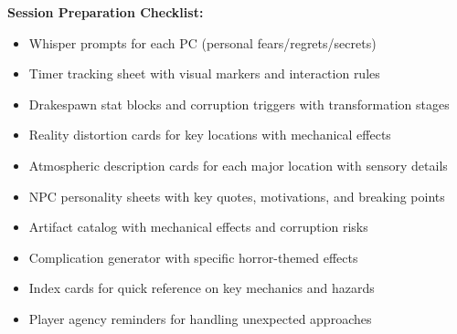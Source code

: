 \documentclass[11pt]{article}
\begin{document}
\textbf{Session Preparation Checklist:}
\begin{itemize}
\item [✓] Whisper prompts for each PC (personal fears/regrets/secrets)
\item [✓] Timer tracking sheet with visual markers and interaction rules
\item [✓] Drakespawn stat blocks and corruption triggers with transformation stages
\item [✓] Reality distortion cards for key locations with mechanical effects
\item [✓] Atmospheric description cards for each major location with sensory details
\item [✓] NPC personality sheets with key quotes, motivations, and breaking points
\item [✓] Artifact catalog with mechanical effects and corruption risks
\item [✓] Complication generator with specific horror-themed effects
\item [✓] Index cards for quick reference on key mechanics and hazards
\item [✓] Player agency reminders for handling unexpected approaches
\end{itemize}
\end{document}
